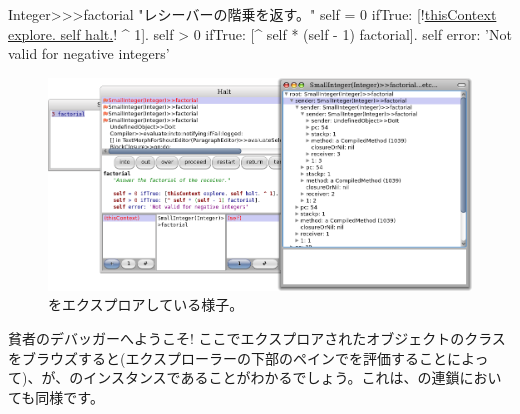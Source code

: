 \documentclass[a4paper,10pt,twoside]{book}
\begin{document}

\begin{code}{}
Integer>>>factorial
	"レシーバーの階乗を返す。"
	self = 0 ifTrue: [!\underline{thisContext explore. self halt.}! ^ 1].
	self > 0 ifTrue: [^ self * (self - 1) factorial].
	self error: 'Not valid for negative integers'
\end{code}


\begin{figure}[ht]\centering
	\includegraphics[width=\linewidth]{exploringThisContext}
	\caption{をエクスプロアしている様子。}
\end{figure}

貧者のデバッガーへようこそ!
ここでエクスプロアされたオブジェクトのクラスをブラウズすると(\ie エクスプローラーの下部のペインでを評価することによって)、が、のインスタンスであることがわかるでしょう。これは、の連鎖においても同様です。
\end{document}
